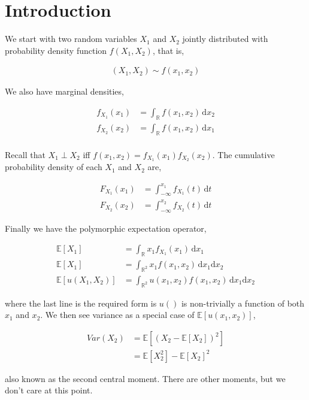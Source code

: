 \section{Introduction}

We start with two random variables $X_1$ and $X_2$ jointly distributed with probability density function $f(X_1, X_2)$, that is,

\begin{align*}
(X_1, X_2) \sim f(x_1, x_2)
\end{align*}

We also have marginal densities,

\begin{align*}
f_{X_1}(x_1) &= \int_{\mathbb{R}}f(x_1, x_2)\, \mathrm{d}x_2\\ 
f_{X_2}(x_2) &= \int_{\mathbb{R}}f(x_1, x_2)\, \mathrm{d}x_1\\ 
\end{align*}

Recall that $X_1 \perp X_2$ iff $f(x_1, x_2) = f_{X_1}(x_1)f_{X_2}(x_2)$. The cumulative probability density of each $X_1$ and $X_2$ are,

\begin{align*}
F_{X_1}(x_1) &= \int_{-\infty}^{x_1}f_{X_1}(t)\,\mathrm{d}t\\
F_{X_2}(x_2) &= \int_{-\infty}^{x_2}f_{X_2}(t)\,\mathrm{d}t
\end{align*}

Finally we have the polymorphic expectation operator,

\begin{align*}
\mathbb{E}[X_1] &= \int_{\mathbb{R}} x_1 f_{X_1}(x_1)\,\mathrm{d}x_1\\
\mathbb{E}[X_1] &= \int_{\mathbb{R}^2} x_1 f(x_1,x_2)\,\mathrm{d}x_1\mathrm{d}x_2\\
\mathbb{E}[u(X_1, X_2)] &= \int_{\mathbb{R}^2} u(x_1, x_2) f(x_1,x_2)\,\mathrm{d}x_1\mathrm{d}x_2
\end{align*}

where the last line is the required form is $u()$ is non-trivially a function of both $x_1$ and $x_2$. We then see variance as a special case of $\mathbb{E}[u(x_1, x_2)]$,

\begin{align*}
Var(X_2) &= \mathbb{E}[(X_2 - \mathbb{E}[X_2])^2]\\
         &= \mathbb{E}[X_2^2] - \mathbb{E}[X_2]^2
\end{align*}

also known as the second central moment. There are other moments, but we don't care at this point.

